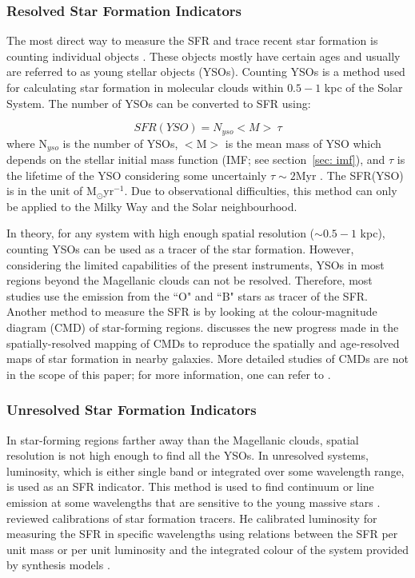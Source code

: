 \subsubsection{Resolved Star Formation Indicators}
The most direct way to measure the SFR and trace recent star formation is counting individual objects \citep{Kennicutt12}. These objects mostly have certain ages and usually are referred to as young stellar objects (YSOs). Counting YSOs is a method used for calculating star formation in molecular clouds within $0.5- 1$ kpc of the Solar System. The number of YSOs can be converted to SFR using: 

\begin{equation}
SFR(YSO) = N_{yso} <M> \ \tau 
\end{equation}
where N$_{yso}$ is the number of YSOs, $<$M$>$ is the mean mass of YSO which depends on the stellar initial mass function (IMF; see section~\ref{sec: imf}), and $\tau$ is the lifetime of the YSO considering some uncertainly $\tau \sim 2$Myr \citep{Evans09}. The SFR(YSO) is in the unit of M$_{\odot}$yr$^{-1}$. Due to observational difficulties, this method can only be applied to the Milky Way and the Solar neighbourhood. 

In theory, for any system with high enough spatial resolution ($\sim 0.5- 1$ kpc), counting YSOs can be used as a tracer of the star formation. However, considering the limited capabilities of the present instruments, YSOs in most regions beyond the Magellanic clouds can not be resolved. Therefore, most studies use the emission from the ``O" and ``B" stars as tracer of the SFR. Another method to measure the SFR is by looking at the colour-magnitude diagram (CMD) of star-forming regions. \cite{Kennicutt12} discusses the new progress made in the spatially-resolved mapping of CMDs to reproduce the spatially and age-resolved maps of star formation in nearby galaxies. More detailed studies of CMDs are not in the scope of this paper; for more information, one can refer to \citep{Kennicutt12}. 

\subsubsection{Unresolved Star Formation Indicators}
 In star-forming regions farther away than the Magellanic clouds, spatial resolution is not high enough to find all the YSOs. In unresolved systems, luminosity, which is either single band or integrated over some wavelength range, is used as an SFR indicator. This method is used to find continuum or line emission at some wavelengths that are sensitive to the young massive stars \citep[e.g.,][]{Kennicutt98b, Calzetti13}. \cite{Kennicutt98b} reviewed calibrations of star formation tracers. He calibrated luminosity for measuring the SFR in specific wavelengths using relations between the SFR per unit mass or per unit luminosity and the integrated colour of the system provided by synthesis models \citep[e.g.,][]{Bruzual93}. 

